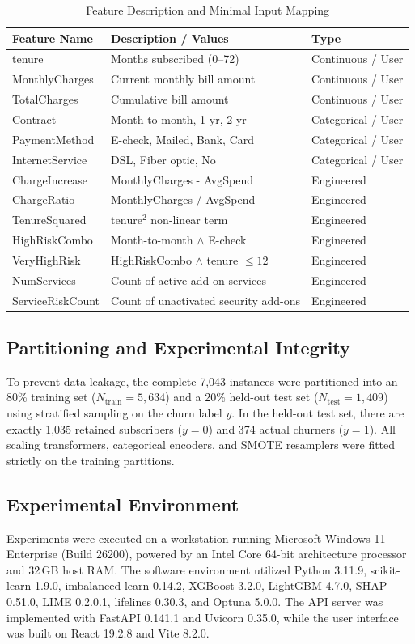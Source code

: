 \documentclass[conference]{IEEEtran}
\begin{document}
\begin{table}[htbp]
\caption{Feature Description and Minimal Input Mapping}
\label{tab:features}
\centering
\begin{tabularx}{\columnwidth}{lXl}
\toprule
\textbf{Feature Name} & \textbf{Description / Values} & \textbf{Type} \\
\midrule
tenure & Months subscribed (0--72) & Continuous / User \\
MonthlyCharges & Current monthly bill amount & Continuous / User \\
TotalCharges & Cumulative bill amount & Continuous / User \\
Contract & Month-to-month, 1-yr, 2-yr & Categorical / User \\
PaymentMethod & E-check, Mailed, Bank, Card & Categorical / User \\
InternetService & DSL, Fiber optic, No & Categorical / User \\
\midrule
ChargeIncrease & MonthlyCharges - AvgSpend & Engineered \\
ChargeRatio & MonthlyCharges / AvgSpend & Engineered \\
TenureSquared & $\text{tenure}^2$ non-linear term & Engineered \\
HighRiskCombo & Month-to-month $\land$ E-check & Engineered \\
VeryHighRisk & HighRiskCombo $\land$ tenure $\le 12$ & Engineered \\
NumServices & Count of active add-on services & Engineered \\
ServiceRiskCount & Count of unactivated security add-ons & Engineered \\
\bottomrule
\end{tabularx}
\end{table}

\subsection{Partitioning and Experimental Integrity}
To prevent data leakage, the complete 7,043 instances were partitioned into an 80\% training set ($N_{\text{train}} = 5,634$) and a 20\% held-out test set ($N_{\text{test}} = 1,409$) using stratified sampling on the churn label $y$. In the held-out test set, there are exactly 1,035 retained subscribers ($y=0$) and 374 actual churners ($y=1$). All scaling transformers, categorical encoders, and SMOTE resamplers were fitted strictly on the training partitions.

\subsection{Experimental Environment}
Experiments were executed on a workstation running Microsoft Windows 11 Enterprise (Build 26200), powered by an Intel Core 64-bit architecture processor and 32\,GB host RAM. The software environment utilized Python 3.11.9, scikit-learn 1.9.0, imbalanced-learn 0.14.2, XGBoost 3.2.0, LightGBM 4.7.0, SHAP 0.51.0, LIME 0.2.0.1, lifelines 0.30.3, and Optuna 5.0.0. The API server was implemented with FastAPI 0.141.1 and Uvicorn 0.35.0, while the user interface was built on React 19.2.8 and Vite 8.2.0.
\end{document}
